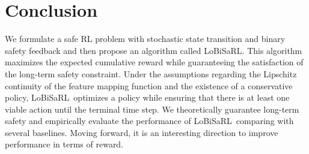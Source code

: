 \documentclass[letterpaper]{article} %
\newcommand{\algo}{\textsf{LoBiSaRL}}
\begin{document}
\section{Conclusion}

We formulate a safe RL problem with stochastic state transition and binary safety feedback and then propose an algorithm called \algo.
This algorithm maximizes the expected cumulative reward while guaranteeing the satisfaction of the long-term safety constraint.
Under the assumptions regarding the Lipschitz continuity of the feature mapping function and the existence of a conservative policy, \algo~optimizes a policy while ensuring that there is at least one viable action until the terminal time step.
We theoretically guarantee long-term safety and empirically evaluate the performance of \algo~comparing with several baselines.
Moving forward, it is an interesting direction to improve performance in terms of reward.



\onecolumn
\appendix

\end{document}
